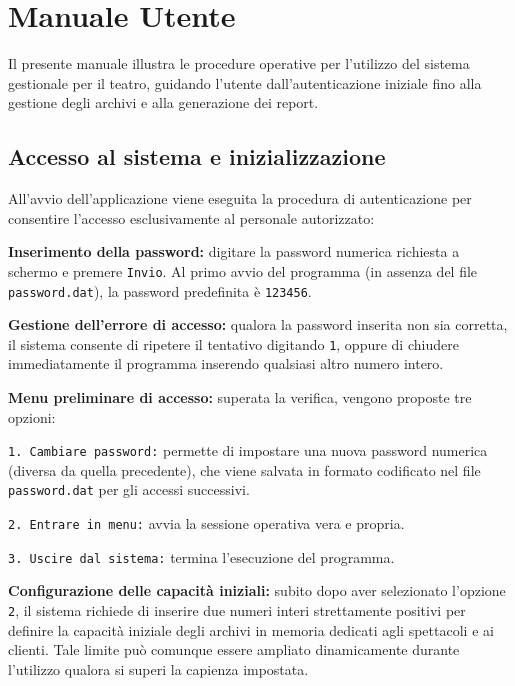 \documentclass[11pt,a4paper,oneside,openany]{book}
\newenvironment{listacomp}{%
    \small
    \begin{list}{\textendash}{%
        \setlength{\topsep}{2pt}%
        \setlength{\partopsep}{0pt}%
        \setlength{\itemsep}{1pt}%
        \setlength{\parsep}{0pt}%
        \setlength{\leftmargin}{1.2em}%
    }%
}{%
    \end{list}%
}
\begin{document}
\chapter{Manuale Utente}

Il presente manuale illustra le procedure operative per l'utilizzo del sistema gestionale per il teatro, guidando l'utente dall'autenticazione iniziale fino alla gestione degli archivi e alla generazione dei report.

\section{Accesso al sistema e inizializzazione}
All'avvio dell'applicazione viene eseguita la procedura di autenticazione per consentire l'accesso esclusivamente al personale autorizzato:
\begin{listacomp}
    \item \textbf{Inserimento della password:} digitare la password numerica richiesta a schermo e premere \texttt{Invio}. Al primo avvio del programma (in assenza del file \texttt{password.dat}), la password predefinita è \texttt{123456}.
    \item \textbf{Gestione dell'errore di accesso:} qualora la password inserita non sia corretta, il sistema consente di ripetere il tentativo digitando \texttt{1}, oppure di chiudere immediatamente il programma inserendo qualsiasi altro numero intero.
    \item \textbf{Menu preliminare di accesso:} superata la verifica, vengono proposte tre opzioni:
    \begin{listacomp}
        \item \texttt{1. Cambiare password:} permette di impostare una nuova password numerica (diversa da quella precedente), che viene salvata in formato codificato nel file \texttt{password.dat} per gli accessi successivi.
        \item \texttt{2. Entrare in menu:} avvia la sessione operativa vera e propria.
        \item \texttt{3. Uscire dal sistema:} termina l'esecuzione del programma.
    \end{listacomp}
    \item \textbf{Configurazione delle capacità iniziali:} subito dopo aver selezionato l'opzione \texttt{2}, il sistema richiede di inserire due numeri interi strettamente positivi per definire la capacità iniziale degli archivi in memoria dedicati agli spettacoli e ai clienti. Tale limite può comunque essere ampliato dinamicamente durante l'utilizzo qualora si superi la capienza impostata.
\end{listacomp}
\end{document}
